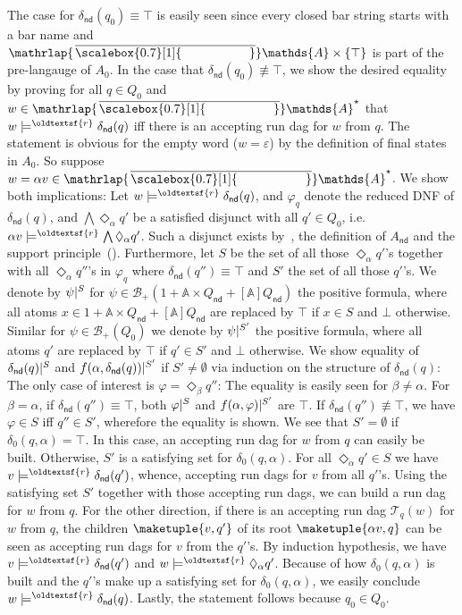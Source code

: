 \documentclass[10pt,a4paper]{amsart}
\theoremstyle{definition}
\renewcommand{\textsf}[1]{{\oldtextsf{\small#1}}}
\newcommand\restr[2]{{%
  \left.\kern-\nulldelimiterspace %
  #1 %
  \littletaller %
  \right|{}^{#2} %
}}
\newcommand{\littletaller}{\mathchoice{\vphantom{\big|}}{}{}{}}
\newcommand{\At}{\mathds{A}}
\newcommand{\barAs}{\barNames^{\star}}
\newcommand{\op}[1]{\operatorname{\mathsf{#1}}}
\newcommand{\nd}{\op{nd}}
\newcommand{\allbool}{\mathcal{B}}
\newcommand{\posbool}{\allbool_+}
\newcommand{\runtree}[3]{\mathcal{T}_{#1}^{#2}(#3)}
\newcommand{\rsem}{\vDash^{\textsf{r}}}
\newcommand{\names}{\At}
\newcommand{\Abstr}[2][\names]{[#1]#2}
\newcommand{\set}[1]{\{#1\}}
\newcommand{\mybar}[3]{%
  \mathrlap{\hspace{#2}\overline{\scalebox{#1}[1]{\phantom{\ensuremath{#3}}}}}\ensuremath{#3}
}
\newcommand{\barNames}{{\mybar{0.7}{1.25pt}{\names}}}
\renewcommand{\vDash}{\models}
\let\originalleft\left
\let\originalright\right
\renewcommand{\left}{\mathopen{}\mathclose\bgroup\originalleft}
\renewcommand{\right}{\aftergroup\egroup\originalright}
\begin{document}
\begin{IEEEproof}
The case for $\delta_{\nd}(q_0) \equiv \top$ is easily seen since every closed bar string
starts with a bar name and $\barNames \times \set{\top}$ is part of the pre-langauge
of $A_0$. In the case that $\delta_{\nd}(q_0) \not\equiv \top$, we show the desired
equality by proving for all $q \in Q_0$ and $w \in \barAs$ that $w \rsem \delta_{\nd}(q)$
iff there is an accepting run dag for $w$ from $q$. The statement is obvious for the
empty word ($w = \varepsilon$) by the definition of final states in $A_0$. So suppose
$w = \alpha v \in \barAs$. We show both implications: Let $w \rsem \delta_{\nd}(q)$,
and $\varphi_q$ denote the reduced DNF of $\delta_{\nd}(q)$, and $\bigwedge \Diamond_{\alpha}q'$
be a satisfied disjunct with all $q' \in Q_0$, i.e.~$\alpha v \rsem \bigwedge \Diamond_{\alpha}q'$.
Such a disjunct exists by~, the definition of $A_{\nd}$ and the
support principle~(). Furthermore, let $S$ be the set of all those
$\Diamond_{\alpha}q'$'s together with all $\Diamond_{\alpha}q''$'s in $\varphi_q$ where
$\delta_{\nd}(q'') \equiv \top$ and $S'$ the set of all those $q'$'s. We denote by $\restr{\psi}{S}$
for $\psi \in \posbool(1 + \names \times Q_{\nd} + \Abstr{Q_{\nd}})$ the positive formula,
where all atoms $x \in 1 + \names \times Q_{\nd} + \Abstr{Q_{\nd}}$ are replaced by
$\top$ if $x \in S$ and $\bot$ otherwise. Similar for $\psi \in \posbool(Q_0)$ we denote
by $\restr{\psi}{S'}$ the positive formula, where all atoms $q'$ are replaced by $\top$
if $q' \in S'$ and $\bot$ otherwise. We show equality of $\restr{\delta_{\nd}(q)}{S}$
and $\restr{f(\alpha, \delta_{\nd}(q))}{S'}$ if $S' \neq \emptyset$ via induction on the
structure of $\delta_{\nd}(q)$: The only case of interest is $\varphi = \Diamond_{\beta} q''$:
The equality is easily seen for $\beta \neq \alpha$. For $\beta = \alpha$, if
$\delta_{\nd}(q'') \equiv \top$, both $\restr{\varphi}{S}$ and $\restr{f(\alpha, \varphi)}{S'}$
are $\top$. If $\delta_{\nd}(q'') \not\equiv \top$, we have $\varphi \in S$ iff
$q'' \in S'$, wherefore the equality is shown.
We see that $S' = \emptyset$ if $\delta_0(q, \alpha) = \top$. In this case, an accepting run
dag for $w$ from $q$ can easily be built. Otherwise, $S'$ is a satisfying set for $\delta_0(q, \alpha)$.
For all $\Diamond_\alpha q' \in S$ we have $v \rsem \delta_{\nd}(q')$, whence, accepting run dags
for $v$ from all $q'$'s.
Using the satisfying set $S'$ together with those accepting run dags, we can build a run dag for
$w$ from $q$.
For the other direction, if there is an accepting run dag $\runtree{q}{}{w}$ for $w$ from $q$, the
children $\maketuple{v, q'}$ of its root $\maketuple{\alpha v, q}$ can be seen as accepting run dags for $v$
from the $q'$'s. By induction hypothesis, we have $v \rsem \delta_{\nd}(q')$ and $w \rsem \Diamond_{\alpha}q'$.
Because of how $\delta_0(q, \alpha)$ is built and the $q'$'s make up a satisfying set for $\delta_0(q, \alpha)$,
we easily conclude $w \rsem \delta_{\nd}(q)$. Lastly, the statement follows because $q_0 \in Q_0$.
\end{IEEEproof}
\end{document}
